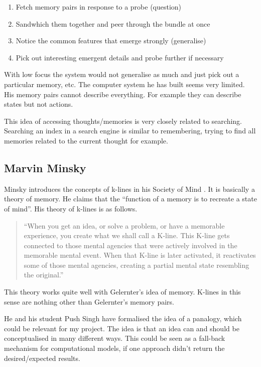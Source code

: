 \begin{enumerate}
  \item Fetch memory pairs in response to a probe (question)
  \item Sandwhich them together and peer through the bundle at once
  \item Notice the common features that emerge strongly (generalise)
  \item Pick out interesting emergent details and probe further if necessary
\end{enumerate}

With low focus the system would not generalise as much and just pick out a particular memory, etc. The computer system he has built seems very limited. His memory pairs cannot describe everything. For example they can describe states but not actions.

This idea of accessing thoughts/memories is very closely related to searching. Searching an index in a search engine is similar to remembering, trying to find all memories related to the current thought for example.


\subsection*{Marvin Minsky}

Minsky introduces the concepts of k-lines in his Society of Mind \autocite{Minsky1980, Minsky1988}. It is basically a theory of memory. He claims that the ``function of a memory is to recreate a state of mind''. His theory of k-lines is as follows.

\begin{quotation}
  ``When you get an idea, or solve a problem, or have a memorable experience, you create what we shall call a K-line. This K-line gets connected to those mental agencies that were actively involved in the memorable mental event. When that K-line is later activated, it reactivates some of those mental agencies, creating a partial mental state resembling the original.'' 
\end{quotation}

This theory works quite well with Gelernter's idea of memory. K-lines in this sense are nothing other than Gelernter's memory pairs.

He and his student Push Singh have formalised the idea of a panalogy, which could be relevant for my project. The idea is that an idea can and should be conceptualised in many different ways. This could be seen as a fall-back mechanism for computational models, if one approach didn't return the desired/expected results.


